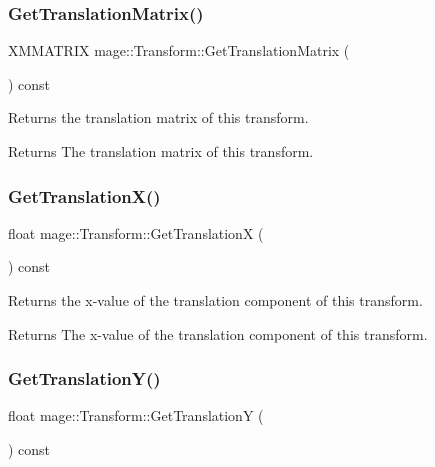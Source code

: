 \subsubsection{\texorpdfstring{Get\+Translation\+Matrix()}{GetTranslationMatrix()}}
{\footnotesize\ttfamily X\+M\+M\+A\+T\+R\+IX mage\+::\+Transform\+::\+Get\+Translation\+Matrix (\begin{DoxyParamCaption}{ }\end{DoxyParamCaption}) const}

Returns the translation matrix of this transform.

\begin{DoxyReturn}{Returns}
The translation matrix of this transform. 
\end{DoxyReturn}
\hypertarget{structmage_1_1_transform_a171525f6ba157e319646548f2c459395}{}\label{structmage_1_1_transform_a171525f6ba157e319646548f2c459395} 
\subsubsection{\texorpdfstring{Get\+Translation\+X()}{GetTranslationX()}}
{\footnotesize\ttfamily float mage\+::\+Transform\+::\+Get\+TranslationX (\begin{DoxyParamCaption}{ }\end{DoxyParamCaption}) const}

Returns the x-\/value of the translation component of this transform.

\begin{DoxyReturn}{Returns}
The x-\/value of the translation component of this transform. 
\end{DoxyReturn}
\hypertarget{structmage_1_1_transform_a7feba3c1d24a986e440dd6571edc14b2}{}\label{structmage_1_1_transform_a7feba3c1d24a986e440dd6571edc14b2} 
\subsubsection{\texorpdfstring{Get\+Translation\+Y()}{GetTranslationY()}}
{\footnotesize\ttfamily float mage\+::\+Transform\+::\+Get\+TranslationY (\begin{DoxyParamCaption}{ }\end{DoxyParamCaption}) const}


